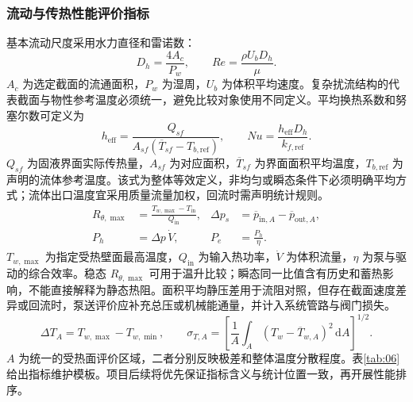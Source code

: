 \documentclass[UTF8]{midterm}
\begin{document}
\subsubsection{流动与传热性能评价指标}
基本流动尺度采用水力直径和雷诺数：
\begin{equation}
D_h=\frac{4A_c}{P_w},\qquad Re=\frac{\rho U_bD_h}{\mu}.\label{eq:re}
\end{equation}
$A_c$ 为选定截面的流通面积，$P_w$ 为湿周，$U_b$ 为体积平均速度。复杂扰流结构的代表截面与物性参考温度必须统一，避免比较对象使用不同定义。平均换热系数和努塞尔数可定义为
\begin{equation}
h_{\mathrm{eff}}=\frac{Q_{sf}}{A_{sf}(\overline T_{sf}-T_{b,\mathrm{ref}})},\qquad Nu=\frac{h_{\mathrm{eff}}D_h}{k_{f,\mathrm{ref}}}.\label{eq:nu}
\end{equation}
$Q_{sf}$ 为固液界面实际传热量，$A_{sf}$ 为对应面积，$\overline T_{sf}$ 为界面面积平均温度，$T_{b,\mathrm{ref}}$ 为声明的流体参考温度。该式为整体等效定义，非均匀或瞬态条件下必须明确平均方式；流体出口温度宜采用质量流量加权，回流时需声明统计规则。
\begin{equation}\begin{aligned}
R_{\theta,\max}&=\frac{T_{w,\max}-T_{\mathrm{in}}}{Q_{\mathrm{in}}},&
\Delta p_s&=\overline p_{\mathrm{in},A}-\overline p_{\mathrm{out},A},\\
P_h&=\Delta p\,\dot V,& P_e&=\frac{P_h}{\eta}.
\end{aligned}\label{eq:resistance}
\end{equation}
$T_{w,\max}$ 为指定受热壁面最高温度，$Q_{\mathrm{in}}$ 为输入热功率，$\dot V$ 为体积流量，$\eta$ 为泵与驱动的综合效率。稳态 $R_{\theta,\max}$ 可用于温升比较；瞬态同一比值含有历史和蓄热影响，不能直接解释为静态热阻。面积平均静压差用于流阻对照，但存在截面速度差异或回流时，泵送评价应补充总压或机械能通量，并计入系统管路与阀门损失。
\begin{equation}
\Delta T_A=T_{w,\max}-T_{w,\min},\qquad
\sigma_{T,A}=\left[\frac{1}{A}\int_A(T_w-\overline T_{w,A})^2\,\mathrm dA\right]^{1/2}.\label{eq:uniformity}
\end{equation}
$A$ 为统一的受热面评价区域，二者分别反映极差和整体温度分散程度。表\ref{tab:06}给出指标维护模板。项目后续将优先保证指标含义与统计位置一致，再开展性能排序。
\end{document}
